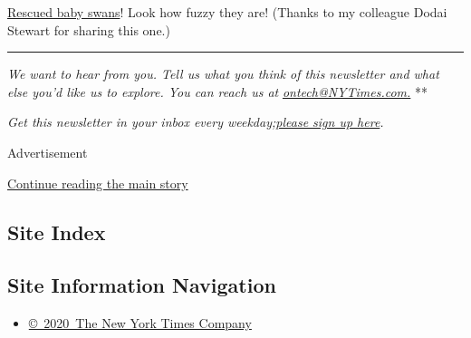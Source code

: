 \href{https://twitter.com/wildbirdfund/status/1272639253898571776}{Rescued
baby swans}! Look how fuzzy they are! (Thanks to my colleague Dodai
Stewart for sharing this one.)

\begin{center}\rule{0.5\linewidth}{\linethickness}\end{center}

\emph{We want to hear from you. Tell us what you think of this
newsletter and what else you'd like us to explore. You can reach us at}
\href{mailto:ontech@NYTimes.com?subject=On\%20Tech\%20Feedback}{\emph{ontech@NYTimes.com.}}
**

\emph{Get this newsletter in your inbox every
weekday;}\href{https://www.nytimes3xbfgragh.onion/newsletters/signup/OT}{\emph{please
sign up here}}\emph{.}

Advertisement

\protect\hyperlink{after-bottom}{Continue reading the main story}

\hypertarget{site-index}{%
\subsection{Site Index}\label{site-index}}

\hypertarget{site-information-navigation}{%
\subsection{Site Information
Navigation}\label{site-information-navigation}}

\begin{itemize}
\tightlist
\item
  \href{https://help.nytimes3xbfgragh.onion/hc/en-us/articles/115014792127-Copyright-notice}{©~2020~The
  New York Times Company}
\end{itemize}

